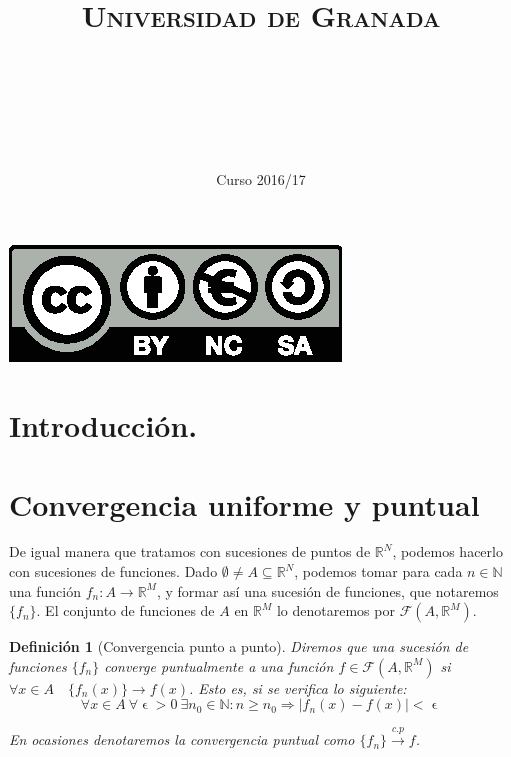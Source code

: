 \documentclass[11pt, a4paper]{article}
\title{
  \normalfont \normalsize 
  \textsc{Universidad de Granada} \\ [25pt]    %
  \horrule{0.5pt} \\[0.4cm] %
  \huge \subject\\ %
  \horrule{2pt} \\[0.5cm] %
}
\author{\Large{\docauthor}}
\date{\vspace{-1.5em} \normalsize Curso 2016/17}
\let\epsilon\upvarepsilon
\newcommand{\R}{\mathbb{R}}
\newcommand{\fn}{\{f_n\}}
\theoremstyle{theorem-style}
\theoremstyle{definition-style}
\newtheorem*{ndef}{Definición}
\theoremstyle{remark-style}
\theoremstyle{example-style}
\begin{document}
\maketitle  %
\vfill
\begin{center}
\includegraphics{../Recursos/Plantillas/by-nc-sa.eps}  %
\end{center}
\newpage
\tableofcontents    %
\newpage



\section*{Introducción.}



\section{Convergencia uniforme y puntual}
De igual manera que tratamos con sucesiones de puntos de $\R^N$, podemos hacerlo con sucesiones de funciones. Dado $\emptyset \ne A \subseteq \R^N$, podemos tomar para cada $n \in \mathbb{N}$ una función $f_n : A \to \R^M$, y formar así una sucesión de funciones, que notaremos $\{f_n\}$. El conjunto de funciones de $A$ en $\mathbb{R}^M$ lo denotaremos por $\mathcal{F}(A,\mathbb{R}^M)$. 

\begin{ndef}[Convergencia punto a punto] Diremos que una sucesión de funciones $\fn$ converge puntualmente a una función $f\in \mathcal{F}(A,\mathbb{R}^M)$ si $\forall x \in A \quad \{f_n(x)\} \rightarrow f(x)$. Esto es, si se verifica lo siguiente:
	\[
		\forall x\in A\ \forall \epsilon > 0\ \exists n_0 \in \mathbb{N}: n \ge n_0 \Rightarrow |f_n(x)-f(x)| < \epsilon 
	\]
	
En ocasiones denotaremos la convergencia puntual como $\fn \xrightarrow {c.p} f$. 
\end{ndef}
\end{document}
